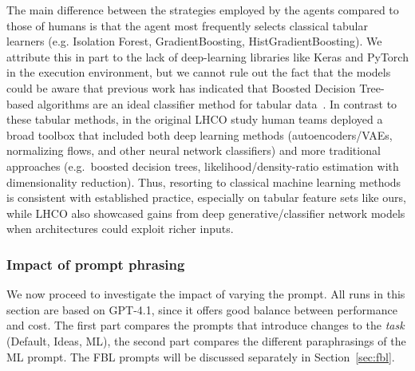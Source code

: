 \documentclass[submission, Phys]{SciPost}
\begin{document}
The main difference between the strategies employed by the agents compared to those of humans is that the agent most frequently selects classical tabular learners (e.g. Isolation Forest, GradientBoosting, HistGradientBoosting). We attribute this in part to the lack of deep-learning libraries like Keras and PyTorch in the execution environment, but we cannot rule out the fact that the models could be aware that previous work has indicated that Boosted Decision Tree-based algorithms are an ideal classifier method for tabular data~\cite{grinsztajn2022treebasedmodelsoutperformdeep, Finke:2023ltw}. In contrast to these tabular methods, in the original LHCO study human teams deployed a broad toolbox that included both deep learning methods (autoencoders/VAEs, normalizing flows, and other neural network classifiers) and more traditional approaches (e.g.\ boosted decision trees, likelihood/density-ratio estimation with dimensionality reduction). Thus, resorting to classical machine learning methods is consistent with established practice, especially on tabular feature sets like ours, while LHCO also showcased gains from deep generative/classifier network models when architectures could exploit richer inputs. 




\subsubsection{Impact of prompt phrasing}
We now proceed to investigate the impact of varying the prompt. All runs in this section are based on GPT-4.1, since it offers good balance between performance and cost. The first part compares the prompts that introduce changes to the \textit{task} (Default, Ideas, ML), the second part compares the different paraphrasings of the ML prompt. The FBL prompts will be discussed separately in Section~\ref{sec:fbl}.
\end{document}
